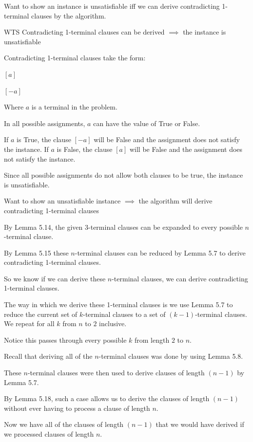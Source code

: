 \documentclass[manuscript]{acmart}
\begin{document}
    Want to show an instance is unsatisfiable iff we can derive contradicting
    1-terminal clauses by the algorithm.

    WTS Contradicting 1-terminal clauses can be derived $\implies$ the instance is unsatisfiable

    Contradicting 1-terminal clauses take the form:

    $[a]$

    $[-a]$

    Where $a$ is a terminal in the problem.

    In all possible assignments, $a$ can have the value of True or False.

    If $a$ is True, the clause $[-a]$ will be False and the assignment does not satisfy the instance.
    If $a$ is False, the clause $[a]$ will be False and the assignment does not satisfy the instance.

    Since all possible assignments do not allow both clauses to be true, 
    the instance is unsatisfiable.

    Want to show an unsatisfiable instance $\implies$ the algorithm will derive contradicting 1-terminal clauses

    By Lemma 5.14, the given 3-terminal clauses can be expanded to every
    possible $n$-terminal clause.

    By Lemma 5.15 these $n$-terminal clauses can be reduced by Lemma 5.7
    to derive contradicting 1-terminal clauses.

    So we know if we can derive these $n$-terminal clauses, we can derive
    contradicting 1-terminal clauses.

    The way in which we derive these 1-terminal clauses is we use
    Lemma 5.7 to reduce the current set of $k$-terminal clauses to
    a set of $(k-1)$-terminal clauses. We repeat for all $k$ from $n$ to $2$
    inclusive.

    Notice this passes through every possible $k$ from length $2$ to $n$.

    Recall that deriving all of the $n$-terminal clauses was done by using
    Lemma 5.8.

    These $n$-terminal clauses were then used to derive clauses of length $(n - 1)$
    by Lemma 5.7.

    By Lemma 5.18, such a case allows us to derive the clauses of length $(n - 1)$
    without ever having to process a clause of length $n$.

    Now we have all of the clauses of length $(n - 1)$ that we would have derived
    if we processed clauses of length $n$.
\end{document}
